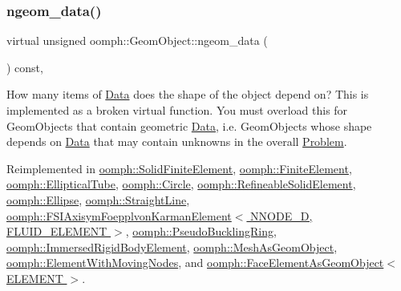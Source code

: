 \mbox{\label{classoomph_1_1GeomObject_a19d325347e19964e127fe124df56f251}} 
\subsubsection{\texorpdfstring{ngeom\+\_\+data()}{ngeom\_data()}}
{\footnotesize\ttfamily virtual unsigned oomph\+::\+Geom\+Object\+::ngeom\+\_\+data (\begin{DoxyParamCaption}{ }\end{DoxyParamCaption}) const\hspace{0.3cm}{\ttfamily [inline]}, {\ttfamily [virtual]}}



How many items of \hyperlink{classoomph_1_1Data}{Data} does the shape of the object depend on? This is implemented as a broken virtual function. You must overload this for Geom\+Objects that contain geometric \hyperlink{classoomph_1_1Data}{Data}, i.\+e. Geom\+Objects whose shape depends on \hyperlink{classoomph_1_1Data}{Data} that may contain unknowns in the overall \hyperlink{classoomph_1_1Problem}{Problem}. 



Reimplemented in \hyperlink{classoomph_1_1SolidFiniteElement_a73f387da7f31f233b79c2526e8cbc896}{oomph\+::\+Solid\+Finite\+Element}, \hyperlink{classoomph_1_1FiniteElement_ae09e3e0c01b6143d511f2626d2ee535c}{oomph\+::\+Finite\+Element}, \hyperlink{classoomph_1_1EllipticalTube_ad137810aac62250463273656db192ed7}{oomph\+::\+Elliptical\+Tube}, \hyperlink{classoomph_1_1Circle_a69d37777c2d4e7e13431a1a1e7f31ad5}{oomph\+::\+Circle}, \hyperlink{classoomph_1_1RefineableSolidElement_a690e24cdbd9308da1b9e705fd0340de8}{oomph\+::\+Refineable\+Solid\+Element}, \hyperlink{classoomph_1_1Ellipse_a7b89731ed0bbe563d323d0eb5e1e708c}{oomph\+::\+Ellipse}, \hyperlink{classoomph_1_1StraightLine_abcc547cb889a1447cac0827698d5c8ca}{oomph\+::\+Straight\+Line}, \hyperlink{classoomph_1_1FSIAxisymFoepplvonKarmanElement_ad3b508a8c906a3e175f9c058a0103023}{oomph\+::\+F\+S\+I\+Axisym\+Foepplvon\+Karman\+Element$<$ N\+N\+O\+D\+E\+\_\+D, F\+L\+U\+I\+D\+\_\+\+E\+L\+E\+M\+E\+N\+T $>$}, \hyperlink{classoomph_1_1PseudoBucklingRing_a9e03780134886a9a2a19358519eca3be}{oomph\+::\+Pseudo\+Buckling\+Ring}, \hyperlink{classoomph_1_1ImmersedRigidBodyElement_a4c5bf4b09a19ea70edf9ec68b41bfd2a}{oomph\+::\+Immersed\+Rigid\+Body\+Element}, \hyperlink{classoomph_1_1MeshAsGeomObject_a47d0c877a05e1d84703052431396cd0c}{oomph\+::\+Mesh\+As\+Geom\+Object}, \hyperlink{classoomph_1_1ElementWithMovingNodes_acd9274afc02b66bb15b368e359c40a6f}{oomph\+::\+Element\+With\+Moving\+Nodes}, and \hyperlink{classoomph_1_1FaceElementAsGeomObject_aa4c65d845266c0fc60bbd0d75d2951bb}{oomph\+::\+Face\+Element\+As\+Geom\+Object$<$ E\+L\+E\+M\+E\+N\+T $>$}.



